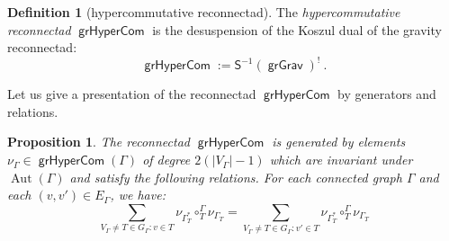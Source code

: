 \documentclass[11pt]{article}
\newtheorem{prop}[theo]{Proposition}
\theoremstyle{definition}
\newtheorem{defi}[theo]{Definition}
\numberwithin{equation}{section}
\DeclareMathOperator{\Aut}{Aut}
\DeclareMathOperator{\grGrav}{\mathsf{grGrav}}
\DeclareMathOperator{\grHyperCom}{\mathsf{grHyperCom}}
\begin{document}
\begin{defi}[hypercommutative reconnectad]
The \emph{hypercommutative reconnectad} $\grHyperCom$ is the desuspension of the Koszul dual of the gravity reconnectad:
 \[
\grHyperCom := \mathsf{S}^{-1}(\grGrav)^! \ . 
 \]
\end{defi}

Let us give a presentation of the reconnectad $\grHyperCom$ by generators and relations.

\begin{prop}\label{prop:hyperpresent}
The reconnectad $\grHyperCom$ is generated by elements $\nu_{\Gamma} \in \grHyperCom(\Gamma)$ of degree $2(|V_\Gamma|-1)$ which are invariant under $\Aut(\Gamma)$ and satisfy the following relations. For each connected graph $\Gamma$ and each $(v,v')\in E_\Gamma$, we have:
\begin{equation}\label{eq:relHyper}
\sum_{V_\Gamma\ne T\in G_\Gamma\colon v \in T} \nu_{\Gamma^*_T}\circ_T^{\Gamma} \nu_{\Gamma_T} =
\sum_{V_\Gamma\ne T\in G_\Gamma\colon v' \in T} \nu_{\Gamma^*_T}\circ_T^{\Gamma} \nu_{\Gamma_T}
\end{equation}
\end{prop}
\end{document}
